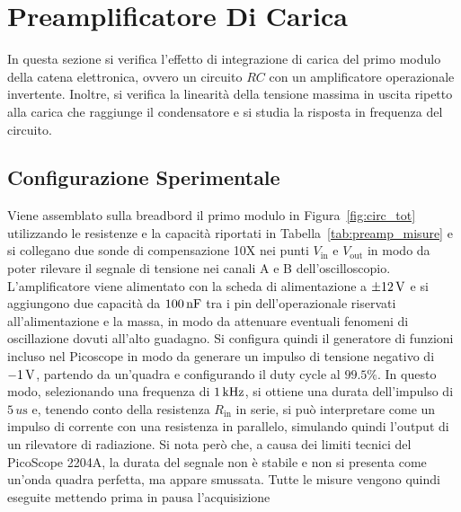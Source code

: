 \section{Preamplificatore Di Carica}
In questa sezione si verifica l'effetto di integrazione di carica del primo modulo della catena elettronica, ovvero un circuito $RC$ con un amplificatore operazionale invertente. Inoltre, si verifica la linearità della tensione massima in uscita ripetto alla carica che raggiunge il condensatore e si studia la risposta in frequenza del circuito.

\subsection{Configurazione Sperimentale}\label{sec:preamp_config_sperim}
Viene assemblato sulla breadbord il primo modulo in Figura~\ref{fig:circ_tot} utilizzando le
resistenze e la capacità riportati in Tabella~\ref{tab:preamp_misure} e si collegano due
sonde di compensazione 10X nei punti $V_{\text{in}}$ e $V_{\text{out}}$ in modo da
poter rilevare il segnale di tensione nei canali A e B dell'oscilloscopio. L'amplificatore viene alimentato con la scheda di alimentazione a $\pm 12\V$ e si aggiungono due capacità da $100\nF$ tra i pin dell'operazionale riservati all'alimentazione e la massa, in modo da attenuare eventuali fenomeni di oscillazione dovuti all'alto guadagno.  Si configura quindi il generatore di
funzioni incluso nel Picoscope in modo da
generare un impulso di tensione negativo di $-1\V$, partendo da un'quadra e
configurando il duty cycle al $99.5 \%$. In questo modo, selezionando una
frequenza di $1\kHz$, si ottiene una durata dell'impulso di $5\,\si{u\s}$ e,
tenendo conto della resistenza $R_{\text{in}}$ in serie, si può interpretare
come un impulso di corrente con una resistenza in parallelo, simulando quindi
l'output di un rilevatore di radiazione. Si nota però che, a causa dei limiti
tecnici del PicoScope 2204A, la durata del segnale non è stabile e non si presenta
come un'onda quadra perfetta, ma appare smussata.
Tutte le misure vengono quindi eseguite mettendo prima in pausa l'acquisizione
